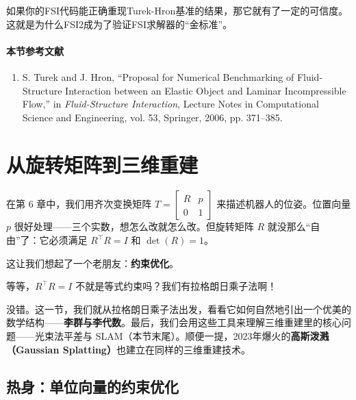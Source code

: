 如果你的FSI代码能正确重现Turek-Hron基准的结果，那它就有了一定的可信度。这就是为什么FSI2成为了验证FSI求解器的“金标准”。

\paragraph{本节参考文献}
\begin{enumerate}
    \item S. Turek and J. Hron, ``Proposal for Numerical Benchmarking of Fluid-Structure Interaction between an Elastic Object and Laminar Incompressible Flow,'' in \textit{Fluid-Structure Interaction}, Lecture Notes in Computational Science and Engineering, vol. 53, Springer, 2006, pp. 371--385.
\end{enumerate}


\section*{从旋转矩阵到三维重建}

在第 6 章中，我们用齐次变换矩阵 $T = \begin{bmatrix} R & p \\ 0 & 1 \end{bmatrix}$ 来描述机器人的位姿。位置向量 $p$ 很好处理——三个实数，想怎么改就怎么改。但旋转矩阵 $R$ 就没那么“自由”了：它必须满足 $R^\top R = I$ 和 $\det(R) = 1$。

这让我们想起了一个老朋友：\textbf{约束优化}。

等等，$R^\top R = I$ 不就是等式约束吗？我们有拉格朗日乘子法啊！

没错。这一节，我们就从拉格朗日乘子法出发，看看它如何自然地引出一个优美的数学结构——\textbf{李群与李代数}。最后，我们会用这些工具来理解三维重建里的核心问题——光束法平差与 SLAM（本节末尾）。顺便一提，2023年爆火的\textbf{高斯泼溅（Gaussian Splatting）}也建立在同样的三维重建技术。

\subsection*{热身：单位向量的约束优化}

